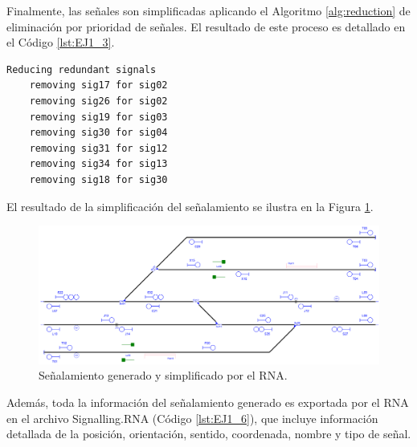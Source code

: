 	Finalmente, las señales son simplificadas aplicando el Algoritmo \ref{alg:reduction} de eliminación por prioridad de señales. El resultado de este proceso es detallado en el Código \ref{lst:EJ1_3}.
	
	\begin{lstlisting}[language = {}, caption = Reducción de señalamiento por prioridad de señales, label = {lst:EJ1_3}]
	Reducing redundant signals
	removing sig17 for sig02
	removing sig26 for sig02
	removing sig19 for sig03
	removing sig30 for sig04
	removing sig31 for sig12
	removing sig34 for sig13
	removing sig18 for sig30
	\end{lstlisting}
	
	El resultado de la simplificación del señalamiento se ilustra en la Figura \ref{fig:EJ1_7}.
	
	\begin{figure}[H]
		\centering
		\includegraphics[width=1\textwidth]{resultados-obtenidos/ejemplo1/images/1_RNA.png}
		\centering\caption{Señalamiento generado y simplificado por el RNA.}
		\label{fig:EJ1_7}
	\end{figure}
	
	Además, toda la información del señalamiento generado es exportada por el RNA en el archivo Signalling.RNA (Código \ref{lst:EJ1_6}), que incluye información detallada de la posición, orientación, sentido, coordenada, nombre y tipo de señal.
		
